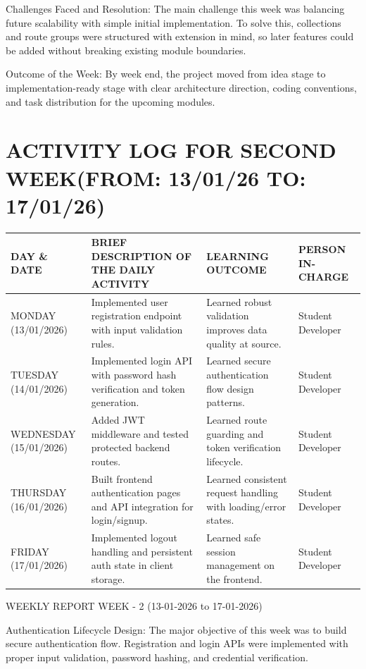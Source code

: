 \documentclass[12pt,a4paper]{report}
\begin{document}
Challenges Faced and Resolution:
The main challenge this week was balancing future scalability with simple initial implementation. To solve this, collections and route groups were structured with extension in mind, so later features could be added without breaking existing module boundaries.

Outcome of the Week:
By week end, the project moved from idea stage to implementation-ready stage with clear architecture direction, coding conventions, and task distribution for the upcoming modules.

\section*{ACTIVITY LOG FOR SECOND WEEK(FROM: 13/01/26 TO: 17/01/26)}
\begin{longtable}{|p{2.2cm}|p{5.2cm}|p{4.3cm}|p{3.2cm}|}
\hline
\textbf{DAY \& DATE} & \textbf{BRIEF DESCRIPTION OF THE DAILY ACTIVITY} & \textbf{LEARNING OUTCOME} & \textbf{PERSON IN- CHARGE} \\
\hline
MONDAY (13/01/2026) & Implemented user registration endpoint with input validation rules. & Learned robust validation improves data quality at source. & Student Developer \\
\hline
TUESDAY (14/01/2026) & Implemented login API with password hash verification and token generation. & Learned secure authentication flow design patterns. & Student Developer \\
\hline
WEDNESDAY (15/01/2026) & Added JWT middleware and tested protected backend routes. & Learned route guarding and token verification lifecycle. & Student Developer \\
\hline
THURSDAY (16/01/2026) & Built frontend authentication pages and API integration for login/signup. & Learned consistent request handling with loading/error states. & Student Developer \\
\hline
FRIDAY (17/01/2026) & Implemented logout handling and persistent auth state in client storage. & Learned safe session management on the frontend. & Student Developer \\
\hline
\end{longtable}

WEEKLY REPORT
WEEK - 2 (13-01-2026 to 17-01-2026)

Authentication Lifecycle Design:
The major objective of this week was to build secure authentication flow. Registration and login APIs were implemented with proper input validation, password hashing, and credential verification.
\end{document}
